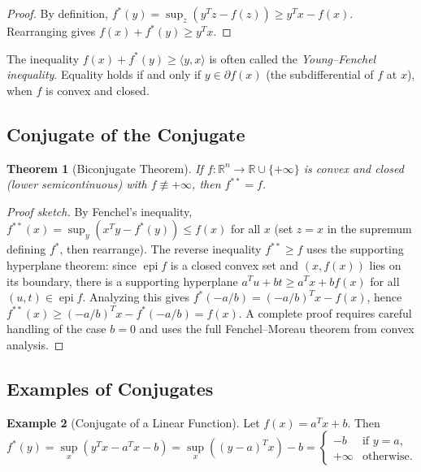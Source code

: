 \documentclass[11pt,a4paper]{article}
\newtheorem{theorem}{Theorem}[section]
\theoremstyle{definition}
\newtheorem{example}[theorem]{Example}
\theoremstyle{remark}
\newcommand{\R}{\mathbb{R}}
\DeclareMathOperator{\epi}{epi}
\begin{document}
\begin{proof}
By definition, $f^*(y) = \sup_z (y^T z - f(z)) \ge y^T x - f(x)$. Rearranging gives
$f(x) + f^*(y) \ge y^T x$.
\end{proof}

\begin{keyresult}[title={Fenchel's Inequality}]
The inequality $f(x) + f^*(y) \ge \langle y, x \rangle$ is often called the
\emph{Young--Fenchel inequality}. Equality holds if and only if $y \in \partial f(x)$
(the subdifferential of $f$ at $x$), when $f$ is convex and closed.
\end{keyresult}

\subsection{Conjugate of the Conjugate}

\begin{theorem}[Biconjugate Theorem]
\label{thm:biconjugate}
If $f : \R^n \to \R \cup \{+\infty\}$ is convex and closed (lower semicontinuous) with
$f \not\equiv +\infty$, then $f^{**} = f$.
\end{theorem}

\begin{proof}[Proof sketch]
By Fenchel's inequality, $f^{**}(x) = \sup_y (x^T y - f^*(y)) \le f(x)$ for all $x$
(set $z = x$ in the supremum defining $f^*$, then rearrange). The reverse inequality
$f^{**} \ge f$ uses the supporting hyperplane theorem: since $\epi f$ is a closed convex
set and $(x, f(x))$ lies on its boundary, there is a supporting hyperplane
$a^T u + bt \ge a^T x + b f(x)$ for all $(u, t) \in \epi f$. Analyzing this gives
$f^*(-a/b) = (-a/b)^T x - f(x)$, hence $f^{**}(x) \ge (-a/b)^T x - f^*(-a/b) = f(x)$.
A complete proof requires careful handling of the case $b = 0$ and uses the full
Fenchel--Moreau theorem from convex analysis.
\end{proof}

\subsection{Examples of Conjugates}

\begin{example}[Conjugate of a Linear Function]
\label{ex:conjugate-linear}
Let $f(x) = a^T x + b$. Then
\[
  f^*(y) = \sup_x (y^T x - a^T x - b) = \sup_x ((y - a)^T x) - b
  = \begin{cases} -b & \text{if } y = a, \\ +\infty & \text{otherwise.} \end{cases}
\]
\end{example}
\end{document}
